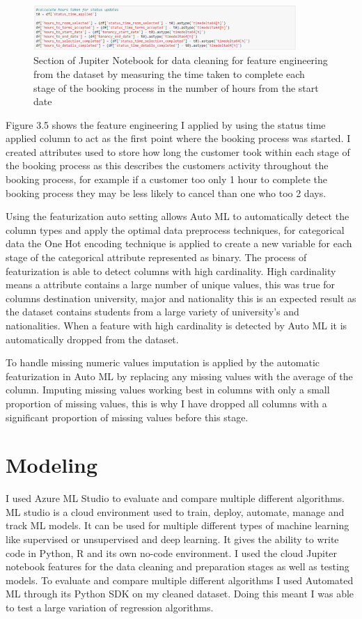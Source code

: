 \begin{figure}[H]
 \includegraphics[width=10cm]{figures/time_variables.png}
 \caption{Section of Jupiter Notebook for data cleaning for feature engineering from the dataset by measuring the time taken to complete each stage of the booking process in the number of hours from the start date}
\end{figure}
Figure 3.5 shows the feature engineering I applied by using the status time applied column to act as the first point where the booking process was started. I created attributes used to store how long the customer took within each stage of the booking process as this describes the customers activity throughout the booking process, for example if a customer too only 1 hour to complete the booking process they may be less likely to cancel than one who too 2 days. 

Using the featurization auto setting allows Auto ML to automatically detect the column types and apply the optimal data preprocess techniques, for categorical data the One Hot encoding technique is applied to create a new variable for each stage of the categorical attribute represented as binary. The process of featurization is able to detect columns with high cardinality.  High cardinality means a attribute contains a large number of unique values, this was true for columns destination university, major and nationality this is an expected result as the dataset contains students from a large variety of university's and nationalities. When a feature with high cardinality is detected by Auto ML it is automatically dropped from the dataset. 

To handle missing numeric values imputation is applied by the automatic featurization in Auto ML by replacing any missing values with the average of the column. Imputing missing values working best in columns with only a small proportion of missing values, this is why I have dropped all columns with a significant proportion of missing values before this stage.

\section{Modeling}

I used Azure ML Studio to evaluate and compare multiple different algorithms. ML studio is a cloud environment used to train, deploy, automate, manage and track ML models. It can be used for multiple different types of machine learning like supervised or unsupervised and deep learning. It gives the ability to write code in Python, R and its own no-code environment.  I used the cloud Jupiter notebook features for the data cleaning and preparation stages as well as testing models. To evaluate and compare multiple different algorithms I used Automated ML through its Python SDK on my cleaned dataset. Doing this meant I was able to test a large variation of regression algorithms.


